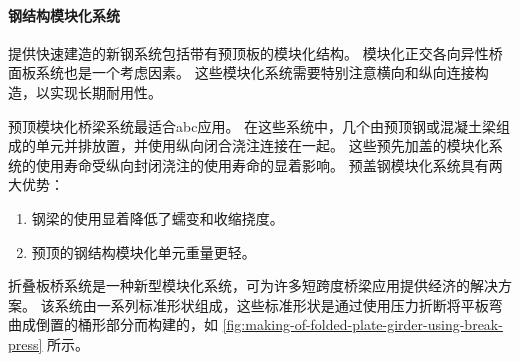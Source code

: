 \paragraph{钢结构模块化系统}
\label{par:steel-modular-system}

提供快速建造的新钢系统包括带有预顶板的模块化结构。 模块化正交各向异性桥面板系统也是一个考虑因素。 这些模块化系统需要特别注意横向和纵向连接构造，以实现长期耐用性。

预顶模块化桥梁系统最适合\acrlong*{abc}应用。 在这些系统中，几个由预顶钢或混凝土梁组成的单元并排放置，并使用纵向闭合浇注连接在一起。 这些预先加盖的模块化系统的{使用寿命}受纵向封闭浇注的{使用寿命}的显着影响。 预盖钢模块化系统具有两大优势：

\begin{enumerate}
  \item 钢梁的使用显着降低了蠕变和收缩挠度。
  \item 预顶的钢结构模块化单元重量更轻。
\end{enumerate}

折叠板桥系统是一种新型模块化系统，可为许多短跨度桥梁应用提供经济的解决方案。 该系统由一系列标准形状组成，这些标准形状是通过使用压力折断将平板弯曲成倒置的桶形部分而构建的，如 \cref{fig:making-of-folded-plate-girder-using-break-press} 所示。

